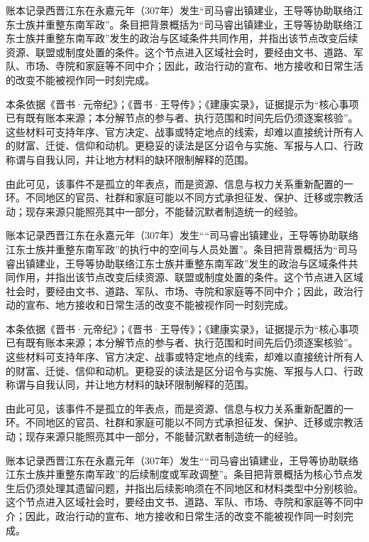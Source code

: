 账本记录西晋江东在永嘉元年（307年）发生“司马睿出镇建业，王导等协助联络江东士族并重整东南军政”。条目把背景概括为“司马睿出镇建业，王导等协助联络江东士族并重整东南军政”发生的政治与区域条件共同作用，并指出该节点改变后续资源、联盟或制度处置的条件。这个节点进入区域社会时，要经由文书、道路、军队、市场、寺院和家庭等不同中介；因此，政治行动的宣布、地方接收和日常生活的改变不能被视作同一时刻完成。

本条依据《晋书·元帝纪》；《晋书·王导传》；《建康实录》，证据提示为“核心事项已有既有账本来源；本分解节点的参与者、执行范围和时间先后仍须逐案核验”。这些材料可支持年序、官方决定、战事或特定地点的线索，却难以直接统计所有人的财富、迁徙、信仰和动机。更稳妥的读法是区分诏令与实施、军报与人口、行政称谓与自我认同，并让地方材料的缺环限制解释的范围。

由此可见，该事件不是孤立的年表点，而是资源、信息与权力关系重新配置的一环。不同地区的官员、社群和家庭可能以不同方式承担征发、保护、迁移或宗教活动；现存来源只能照亮其中一部分，不能替沉默者制造统一的经验。

账本记录西晋江东在永嘉元年（307年）发生““司马睿出镇建业，王导等协助联络江东士族并重整东南军政”的执行中的空间与人员处置”。条目把背景概括为“司马睿出镇建业，王导等协助联络江东士族并重整东南军政”发生的政治与区域条件共同作用，并指出该节点改变后续资源、联盟或制度处置的条件。这个节点进入区域社会时，要经由文书、道路、军队、市场、寺院和家庭等不同中介；因此，政治行动的宣布、地方接收和日常生活的改变不能被视作同一时刻完成。

本条依据《晋书·元帝纪》；《晋书·王导传》；《建康实录》，证据提示为“核心事项已有既有账本来源；本分解节点的参与者、执行范围和时间先后仍须逐案核验”。这些材料可支持年序、官方决定、战事或特定地点的线索，却难以直接统计所有人的财富、迁徙、信仰和动机。更稳妥的读法是区分诏令与实施、军报与人口、行政称谓与自我认同，并让地方材料的缺环限制解释的范围。

由此可见，该事件不是孤立的年表点，而是资源、信息与权力关系重新配置的一环。不同地区的官员、社群和家庭可能以不同方式承担征发、保护、迁移或宗教活动；现存来源只能照亮其中一部分，不能替沉默者制造统一的经验。

账本记录西晋江东在永嘉元年（307年）发生““司马睿出镇建业，王导等协助联络江东士族并重整东南军政”的后续制度或军政调整”。条目把背景概括为核心节点发生后仍须处理其遗留问题，并指出后续影响须在不同地区和材料类型中分别核验。这个节点进入区域社会时，要经由文书、道路、军队、市场、寺院和家庭等不同中介；因此，政治行动的宣布、地方接收和日常生活的改变不能被视作同一时刻完成。

